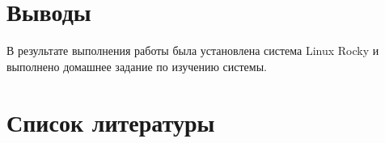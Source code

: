 \documentclass[
  12pt,
  a4paper,
  DIV=11,
  numbers=noendperiod]{scrreprt}
\begin{document}
\chapter{Выводы}\label{ux432ux44bux432ux43eux434ux44b}

В результате выполнения работы была установлена система Linux Rocky и
выполнено домашнее задание по изучению системы.

\chapter*{Список
литературы}\label{ux441ux43fux438ux441ux43eux43a-ux43bux438ux442ux435ux440ux430ux442ux443ux440ux44b}

\printbibliography[heading=none]
\end{document}
